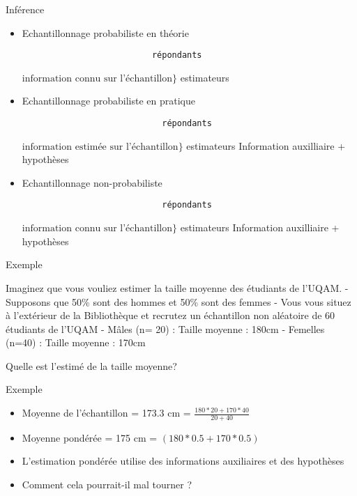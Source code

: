 \documentclass[
  ignorenonframetext,
]{beamer}
\begin{document}
\begin{frame}[fragile]{Inférence}
\protect\hypertarget{infuxe9rence}{}

\begin{itemize}
\item
  Echantillonnage probabiliste en théorie

\begin{verbatim}
                          répondants 
\end{verbatim}

  \(\text{information connu sur l'échantillon} \Bigg\}\) estimateurs
\item
  Echantillonnage probabiliste en pratique

\begin{verbatim}
                            répondants 
\end{verbatim}

  \(\text{information estimée sur l'échantillon} \Bigg\}\) estimateurs
  Information auxilliaire + hypothèses
\item
  Echantillonnage non-probabiliste

\begin{verbatim}
                            répondants 
\end{verbatim}

  \(\text{information connu sur l'échantillon} \Bigg\}\) estimateurs
  Information auxilliaire + hypothèses
\end{itemize}

\end{frame}

\begin{frame}{Exemple}
\protect\hypertarget{exemple}{}

Imaginez que vous vouliez estimer la taille moyenne des étudiants de
l'UQAM. - Supposons que 50\% sont des hommes et 50\% sont des femmes -
Vous vous situez à l'extérieur de la Bibliothèque et recrutez un
échantillon non aléatoire de 60 étudiants de l'UQAM - Mâles (n= 20) :
Taille moyenne : 180cm - Femelles (n=40) : Taille moyenne : 170cm

Quelle est l'estimé de la taille moyenne?

\end{frame}

\begin{frame}{Exemple}
\protect\hypertarget{exemple-1}{}

\begin{itemize}
\item
  Moyenne de l'échantillon = 173.3 cm =
  \(\frac{180*20 + 170*40}{20 + 40}\)
\item
  Moyenne pondérée = 175 cm = \((180*0.5 + 170*0.5)\)
\item
  L'estimation pondérée utilise des informations auxiliaires et des
  hypothèses
\item
  Comment cela pourrait-il mal tourner ?
\end{itemize}

\end{frame}
\end{document}
